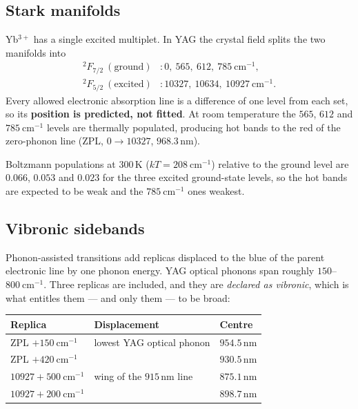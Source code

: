 \documentclass[11pt,a4paper]{article}
\begin{document}
\subsection{Stark manifolds}

Yb$^{3+}$ has a single excited multiplet. In YAG the crystal field splits the
two manifolds into~\cite{fan}
\begin{align}
{}^2F_{7/2}\ (\text{ground}) &: 0,\ 565,\ 612,\ 785\ \mathrm{cm}^{-1},\\
{}^2F_{5/2}\ (\text{excited}) &: 10327,\ 10634,\ 10927\ \mathrm{cm}^{-1}.
\end{align}
Every allowed electronic absorption line is a difference of one level from each
set, so its \textbf{position is predicted, not fitted}. At room temperature the
$565$, $612$ and $785\ \mathrm{cm}^{-1}$ levels are thermally populated,
producing hot bands to the red of the zero-phonon line (ZPL, $0\to10327$,
$968.3$\,nm).

Boltzmann populations at $300$\,K ($kT=208\ \mathrm{cm}^{-1}$) relative to the
ground level are $0.066$, $0.053$ and $0.023$ for the three excited ground-state
levels, so the hot bands are expected to be weak and the $785\
\mathrm{cm}^{-1}$ ones weakest.

\subsection{Vibronic sidebands}

Phonon-assisted transitions add replicas displaced to the blue of the parent
electronic line by one phonon energy. YAG optical phonons span roughly
$150$--$800\ \mathrm{cm}^{-1}$. Three replicas are included, and they are
\emph{declared as vibronic}, which is what entitles them --- and only them --- to
be broad:
\begin{center}\small
\begin{tabular}{@{}lll@{}}
\toprule
Replica & Displacement & Centre \\
\midrule
ZPL $+150\ \mathrm{cm}^{-1}$   & lowest YAG optical phonon & $954.5$\,nm\\
ZPL $+420\ \mathrm{cm}^{-1}$   & & $930.5$\,nm\\
$10927+500\ \mathrm{cm}^{-1}$  & wing of the $915$\,nm line & $875.1$\,nm\\
$10927+200\ \mathrm{cm}^{-1}$  & & $898.7$\,nm\\
\bottomrule
\end{tabular}
\end{center}
\end{document}
